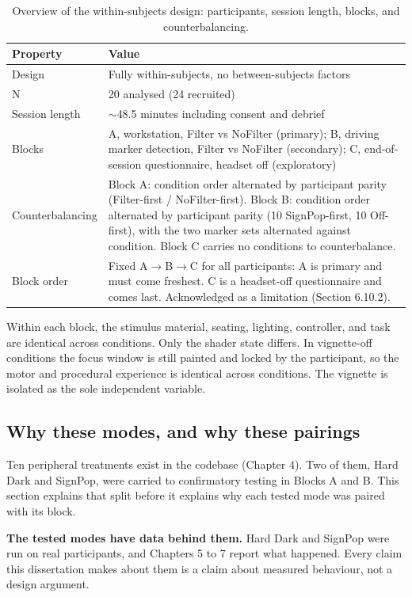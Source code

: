 \begin{longtable}{p{}|p{}}
\caption{Overview of the within-subjects design: participants, session length, blocks, and
counterbalancing.}\\
\hline
\textbf{Property} & \textbf{Value} \\
\hline
\endhead
\hline
Design & Fully within-subjects, no between-subjects factors \\
N & 20 analysed (24 recruited) \\
Session length & $\sim$48.5 minutes including consent and debrief \\
Blocks & A, workstation, Filter vs NoFilter (primary); B, driving marker detection, Filter vs NoFilter (secondary); C, end-of-session questionnaire, headset off (exploratory) \\
Counterbalancing & Block A: condition order alternated by participant parity (Filter-first / NoFilter-first). Block B: condition order alternated by participant parity (10 SignPop-first, 10 Off-first), with the two marker sets alternated against condition. Block C carries no conditions to counterbalance. \\
Block order & Fixed A$\rightarrow$B$\rightarrow$C for all participants: A is primary and must come freshest. C is a headset-off questionnaire and comes last. Acknowledged as a limitation (Section 6.10.2). \\
\hline
\end{longtable}

Within each block, the stimulus material, seating, lighting, controller, and task are identical
across conditions. Only the shader state differs. In vignette-off conditions the focus window is
still painted and locked by the participant, so the motor and procedural experience is identical
across conditions. The vignette is isolated as the sole independent variable.

\subsection{Why these modes, and why these pairings}

Ten peripheral treatments exist in the codebase (Chapter 4). Two of them, Hard Dark and SignPop, were
carried to confirmatory testing in Blocks A and B. This section explains that split before it explains
why each tested mode was paired with its block.

\textbf{The tested modes have data behind them.} Hard Dark and SignPop were run on real participants,
and Chapters 5 to 7 report what happened. Every claim this dissertation makes about them is a claim
about measured behaviour, not a design argument.

